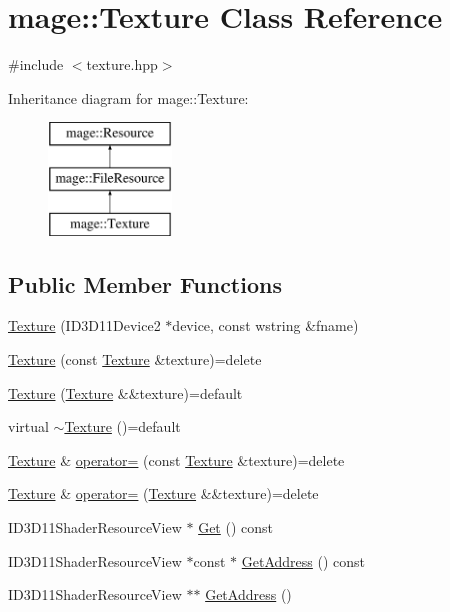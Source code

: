 \hypertarget{classmage_1_1_texture}{}\section{mage\+:\+:Texture Class Reference}
\label{classmage_1_1_texture}


{\ttfamily \#include $<$texture.\+hpp$>$}

Inheritance diagram for mage\+:\+:Texture\+:\begin{figure}[H]
\begin{center}
\leavevmode
\includegraphics[height=3.000000cm]{classmage_1_1_texture}
\end{center}
\end{figure}
\subsection*{Public Member Functions}
\begin{DoxyCompactItemize}
\item 
\hyperlink{classmage_1_1_texture_a680c4df56476b4c66c1e2ffd5bef63c2}{Texture} (I\+D3\+D11\+Device2 $\ast$device, const wstring \&fname)
\item 
\hyperlink{classmage_1_1_texture_aed9e8ab5bc3efdeb381672fd4e243ea7}{Texture} (const \hyperlink{classmage_1_1_texture}{Texture} \&texture)=delete
\item 
\hyperlink{classmage_1_1_texture_a9297257bfe76e744cb02bbbb51f73348}{Texture} (\hyperlink{classmage_1_1_texture}{Texture} \&\&texture)=default
\item 
virtual \hyperlink{classmage_1_1_texture_a81664804ac0259e8c67851409ee106fa}{$\sim$\+Texture} ()=default
\item 
\hyperlink{classmage_1_1_texture}{Texture} \& \hyperlink{classmage_1_1_texture_a0b73b4df98d729c8f60e58b0ca065636}{operator=} (const \hyperlink{classmage_1_1_texture}{Texture} \&texture)=delete
\item 
\hyperlink{classmage_1_1_texture}{Texture} \& \hyperlink{classmage_1_1_texture_a765e9cf3bddedbe2795dea0fe57245ff}{operator=} (\hyperlink{classmage_1_1_texture}{Texture} \&\&texture)=delete
\item 
I\+D3\+D11\+Shader\+Resource\+View $\ast$ \hyperlink{classmage_1_1_texture_a701475a90e2c1e8493a05afb0262c609}{Get} () const
\item 
I\+D3\+D11\+Shader\+Resource\+View $\ast$const  $\ast$ \hyperlink{classmage_1_1_texture_aaf28232c9d81ebea04ef4944b5fec465}{Get\+Address} () const
\item 
I\+D3\+D11\+Shader\+Resource\+View $\ast$$\ast$ \hyperlink{classmage_1_1_texture_ac6f3b08183e4b35972eb5532b2754643}{Get\+Address} ()
\end{DoxyCompactItemize}
